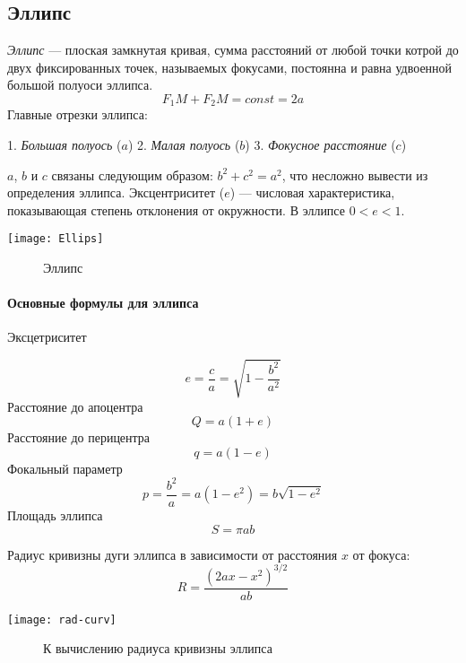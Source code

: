 \subsection{Эллипс}
\textit{Эллипс} --- плоская замкнутая кривая, сумма расстояний от любой точки котрой до двух фиксированных точек, называемых фокусами, постоянна и равна удвоенной большой полуоси эллипса.
\begin{equation}F_1M+F_2M=const=2a
\end{equation}
Главные отрезки эллипса:

1. \textit{Большая полуось} ($a $)
2. \textit{Малая полуось } ($b $)
3. \textit{Фокусное расстояние } ($c $)

$a$, $b$ и $c$ связаны следующим образом: $b^2+c^2=a^2$, что несложно вывести из определения эллипса.
 Эксцентриситет ($e$) --- числовая характеристика, показывающая степень отклонения от окружности. В эллипсе $0<e<1$.
 \begin{center}
\texttt{[image: Ellips]}
\begin{figure}[h!]
\caption{Эллипс}
\end{figure}
\end{center}
\paragraph{Основные формулы для эллипса}

\begin{flushleft}
Эксцетриситет
\end{flushleft}
\begin{equation}
e=\frac{c}{a}=\sqrt{1-\frac{b^2}{a^2}}
\end{equation}
Расстояние до апоцентра
\begin{equation}
Q=a(1+e)
\end{equation}
Расстояние до перицентра
\begin{equation}
q=a(1-e)
\end{equation}
Фокальный параметр
\begin{equation}
p=\frac{b^2}{a}=a(1-e^2)=b\sqrt{1-e^2}
\end{equation}
Площадь эллипса
\begin{equation}
S=\pi ab
\end{equation}

Радиус кривизны дуги эллипса в зависимости от расстояния $x$ от фокуса:
\begin{equation}
R=\frac{(2ax-x^2)^{3/2}}{ab}
\end{equation}
\begin{center}
\texttt{[image: rad-curv]}
\begin{figure}[!h]
\caption{К вычислению радиуса кривизны эллипса}
\end{figure}
\end{center}
